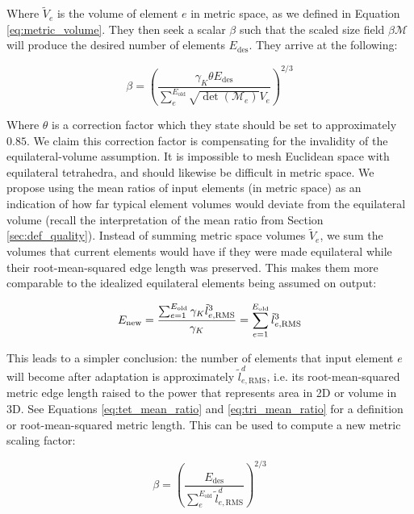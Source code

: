 Where $\tilde{V}_e$ is the volume of element $e$ in metric space,
as we defined in Equation \ref{eq:metric_volume}.
They then seek a scalar $\beta$ such that the scaled size field
$\beta\mathcal{M}$ will produce the desired number of elements
$E_\text{des}$.
They arrive at the following:

\begin{equation}
\beta = \left(\frac{\gamma_K\theta E_{\text{des}}}
{\sum_e^{E_{\text{old}}} \sqrt{\det(\mathcal{M}_e)}V_e}\right)^{2/3}
\end{equation}

Where $\theta$ is a correction factor which they state should
be set to approximately $0.85$.
We claim this correction factor is compensating for the invalidity
of the equilateral-volume assumption.
It is impossible to mesh Euclidean space with equilateral tetrahedra,
and should likewise be difficult in metric space.
We propose using the mean ratios of input elements (in metric space)
as an indication of how far typical element volumes would deviate
from the equilateral volume (recall the interpretation of the
mean ratio from Section \ref{sec:def_quality}).
Instead of summing metric space volumes $\tilde{V}_e$, we sum
the volumes that current elements would have if they were
made equilateral while their root-mean-squared edge length was preserved.
This makes them more comparable to the idealized equilateral
elements being assumed on output:

\begin{equation}
E_{\text{new}} = \frac{\sum_{e=1}^{E_{\text{old}}}
\gamma_K \tilde{l}_{e,\text{RMS}}^3}{\gamma_K}
 = \sum_{e=1}^{E_{\text{old}}} \tilde{l}_{e,\text{RMS}}^3 \\
\end{equation}

This leads to a simpler conclusion: the number of elements that
input element $e$ will become after adaptation is approximately
$\tilde{l}_{e,\text{RMS}}^d$, i.e. its root-mean-squared metric edge length
raised to the power that represents area in 2D or volume in 3D.
See Equations \ref{eq:tet_mean_ratio} and \ref{eq:tri_mean_ratio}
for a definition or root-mean-squared metric length.
This can be used to compute a new metric scaling factor:

\begin{equation} \label{eq:my_metric_scalar}
\beta = \left(\frac{E_{\text{des}}}
{\sum_e^{E_{\text{old}}} \tilde{l}_{e,\text{RMS}}^d}\right)^{2/3}
\end{equation}

